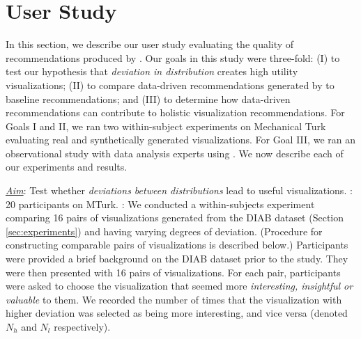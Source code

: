 
\section{User Study}
\label{sec:user_study}

In this section, we describe our user study evaluating the quality of recommendations produced by \SeeDB.
Our goals in this study were three-fold: (I) to test our hypothesis that {\it deviation in distribution} creates high utility visualizations;
(II) to compare data-driven recommendations generated by \SeeDB to baseline recommendations; and 
(III) to determine how data-driven recommendations can contribute to holistic visualization recommendations. 
For Goals I and II, we ran two within-subject\cite{} experiments on Mechanical Turk\cite{} evaluating real and synthetically generated visualizations.
For Goal III, we ran an observational study with data analysis experts using \SeeDB.
We now describe each of our experiments and results.



{\it \underline{Aim}}: Test whether {\it deviations between distributions} lead to useful visualizations.
: 20 participants on MTurk.
: We conducted a within-subjects experiment  comparing 16 pairs of visualizations generated from the DIAB dataset (Section \ref{sec:experiments}) and having varying degrees of deviation. 
(Procedure for constructing comparable pairs of visualizations is described below.)
Participants were provided a brief background on the DIAB dataset prior to the study.
They were then presented with 16 pairs of visualizations. For each pair, participants were asked to choose the visualization that seemed more {\it interesting, insightful or valuable} to them.
We recorded the number of times that the visualization with higher deviation was selected as being more interesting, and vice versa (denoted $N_h$ and $N_l$ respectively).

